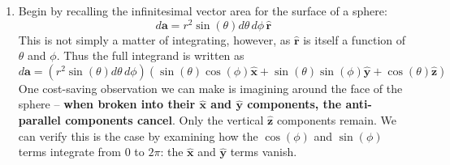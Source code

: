 \documentclass[a4paper]{article}
\begin{document}
\begin{enumerate}[label=(\alph*)]
	\item Begin by recalling the infinitesimal vector area for the surface of a sphere:
	\[
		d \pmb{a} = r^{2}\sin\!\left(\theta\right) d \theta \, d \phi \, \pmb{\hat{r}} 
	\]
	This is not simply a matter of integrating, however, as \( \pmb{\hat{r}} \) is itself a function of \( \theta \) and \( \phi \). Thus the full integrand is written as 
	\[
		d \pmb{a} = \!\left( r^{2}\sin\!\left(\theta\right) d \theta \, d \phi \right)\!\left( \sin\!\left(\theta\right)\cos\!\left(\phi\right)\pmb{\hat{x}} + \sin\!\left(\theta\right)\sin\!\left(\phi\right)\pmb{\hat{y}} + \cos\!\left(\theta\right)\pmb{\hat{z}} \right)
	\]
	One cost-saving observation we can make is imagining around the face of the sphere -- \textbf{when broken into their \( \pmb{\hat{x}} \) and \( \pmb{\hat{y}} \) components, the anti-parallel components cancel}. Only the vertical \( \pmb{\hat{z}} \) components remain. We can verify this is the case by examining how the \( \cos\!\left(\phi\right) \) and \( \sin\!\left(\phi\right) \) terms integrate from \( 0 \) to \( 2 \pi \): the \( \pmb{\hat{x}} \) and \( \pmb{\hat{y}} \) terms vanish.


\end{enumerate}
\end{document}
